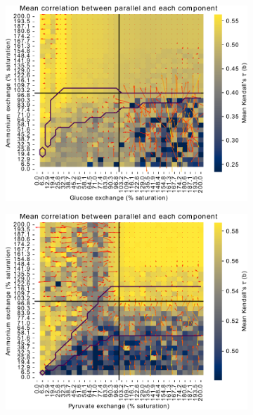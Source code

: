 \begin{figure}
  \begin{subfigure}[t]{0.45\textwidth}
  \centering
    \includegraphics[width=\linewidth]{ec_grid_glc_amm_kendall}
    \caption{
    }
    \label{fig:model-noisy-glc-kendall}
  \end{subfigure}%
  \begin{subfigure}[t]{0.45\textwidth}
  \centering
    \includegraphics[width=\linewidth]{ec_grid_pyr_amm_kendall}
    \caption{
    }
    \label{fig:model-noisy-pyr-kendall}
  \end{subfigure}


\end{figure}
